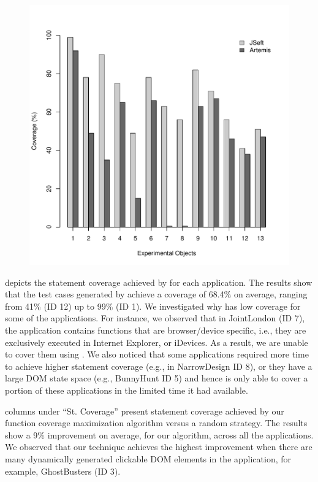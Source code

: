 \begin{figure}[!t]
  \centering
  \includegraphics[width=0.7\hsize]{r-scripts/barplot_coverage}
  \vspace{0.09in} 
  \label{Fig:coverage-graph}
\end{figure}


 depicts the statement coverage achieved by \jseft for each application. The results show that the test cases generated by \jseft achieve a coverage of 68.4\% on average, ranging from 41\% (ID 12) up to 99\% (ID 1).
We investigated why \jseft has low coverage for some of the applications. For instance, we observed that in JointLondon (ID 7), the application contains \javascript functions that are browser/device specific, i.e., they are exclusively executed in Internet Explorer, or iDevices. As a result, we are unable to cover them using \jseft. 
We also noticed that some applications required more time to achieve higher statement coverage (e.g., in NarrowDesign ID 8), or they have a large DOM state space (e.g., BunnyHunt ID 5) and hence \jseft is only able to cover a portion of these applications in the limited time it had available.

 columns under ``St. Coverage'' present \javascript statement coverage achieved by  our function coverage maximization algorithm versus a random strategy. The results show a 9\% improvement on average, for our algorithm, across all the applications. We observed that our technique achieves the highest improvement when there are many dynamically generated clickable DOM elements in the application, for example, GhostBusters (ID 3). 

